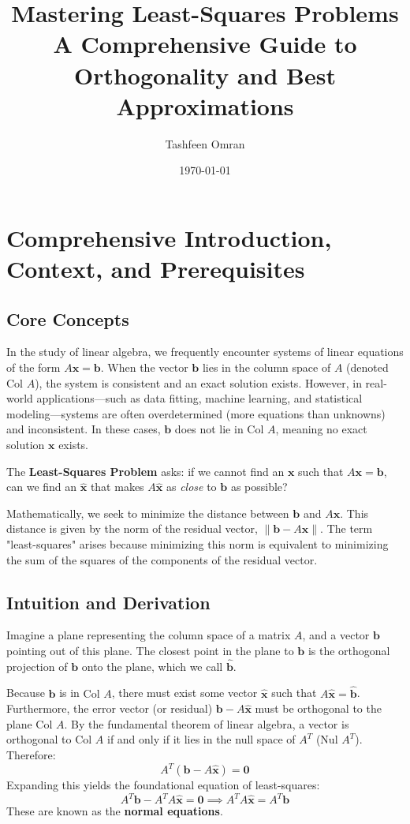 \documentclass[11pt, letterpaper]{article}
\title{\textbf{Mastering Least-Squares Problems}\\ \Large A Comprehensive Guide to Orthogonality and Best Approximations}
\author{Tashfeen Omran}
\date{\today}
\theoremstyle{definition}
\theoremstyle{remark}
\begin{document}
\maketitle
\tableofcontents
\newpage

\section{Comprehensive Introduction, Context, and Prerequisites}

\subsection{Core Concepts}
In the study of linear algebra, we frequently encounter systems of linear equations of the form $A\mathbf{x} = \mathbf{b}$. When the vector $\mathbf{b}$ lies in the column space of $A$ (denoted $\text{Col } A$), the system is consistent and an exact solution exists. However, in real-world applications—such as data fitting, machine learning, and statistical modeling—systems are often overdetermined (more equations than unknowns) and inconsistent. In these cases, $\mathbf{b}$ does not lie in $\text{Col } A$, meaning no exact solution $\mathbf{x}$ exists.

The \textbf{Least-Squares Problem} asks: if we cannot find an $\mathbf{x}$ such that $A\mathbf{x} = \mathbf{b}$, can we find an $\hat{\mathbf{x}}$ that makes $A\hat{\mathbf{x}}$ as \textit{close} to $\mathbf{b}$ as possible? 

Mathematically, we seek to minimize the distance between $\mathbf{b}$ and $A\mathbf{x}$. This distance is given by the norm of the residual vector, $\|\mathbf{b} - A\mathbf{x}\|$. The term "least-squares" arises because minimizing this norm is equivalent to minimizing the sum of the squares of the components of the residual vector.

\subsection{Intuition and Derivation}
Imagine a plane representing the column space of a matrix $A$, and a vector $\mathbf{b}$ pointing out of this plane. The closest point in the plane to $\mathbf{b}$ is the orthogonal projection of $\mathbf{b}$ onto the plane, which we call $\hat{\mathbf{b}}$. 

Because $\hat{\mathbf{b}}$ is in $\text{Col } A$, there must exist some vector $\hat{\mathbf{x}}$ such that $A\hat{\mathbf{x}} = \hat{\mathbf{b}}$. Furthermore, the error vector (or residual) $\mathbf{b} - A\hat{\mathbf{x}}$ must be orthogonal to the plane $\text{Col } A$. 
By the fundamental theorem of linear algebra, a vector is orthogonal to $\text{Col } A$ if and only if it lies in the null space of $A^T$ ($\text{Nul } A^T$). Therefore:
\[ A^T (\mathbf{b} - A\hat{\mathbf{x}}) = \mathbf{0} \]
Expanding this yields the foundational equation of least-squares:
\[ A^T \mathbf{b} - A^T A \hat{\mathbf{x}} = \mathbf{0} \implies A^T A \hat{\mathbf{x}} = A^T \mathbf{b} \]
These are known as the \textbf{normal equations}.
\end{document}
